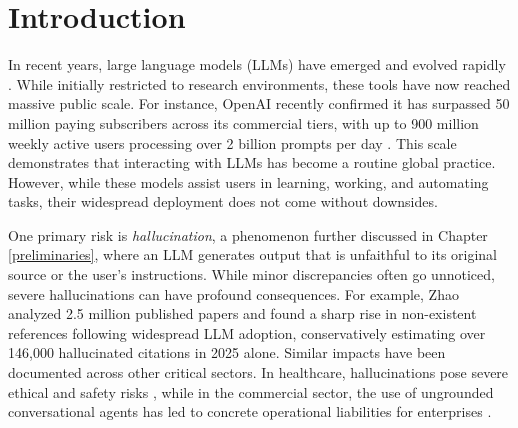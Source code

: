 \chapter{Introduction}\label{introduction}





In recent years, large language models (LLMs) have emerged and evolved rapidly \cite{zhao2023survey}. While initially restricted to research environments, these tools have now reached massive public scale. For instance, OpenAI recently confirmed it has surpassed 50 million paying subscribers across its commercial tiers, with up to 900 million weekly active users processing over 2 billion prompts per day \cite{openai2025enterprise}. This scale demonstrates that interacting with LLMs has become a routine global practice. However, while these models assist users in learning, working, and automating tasks, their widespread deployment does not come without downsides.

One primary risk is \textit{hallucination}, a phenomenon further discussed in Chapter \ref{preliminaries}, where an LLM generates output that is unfaithful to its original source or the user's instructions. While minor discrepancies often go unnoticed, severe hallucinations can have profound consequences. For example, Zhao \etal \cite{zhoa2026llmhallucinationsinthewild} analyzed 2.5 million published papers and found a sharp rise in non-existent references following widespread LLM adoption, conservatively estimating over 146,000 hallucinated citations in 2025 alone. Similar impacts have been documented across other critical sectors. In healthcare, hallucinations pose severe ethical and safety risks \cite{healthcarehallucinations2025}, while in the commercial sector, the use of ungrounded conversational agents has led to concrete operational liabilities for enterprises \cite{lseo2026liability}.


